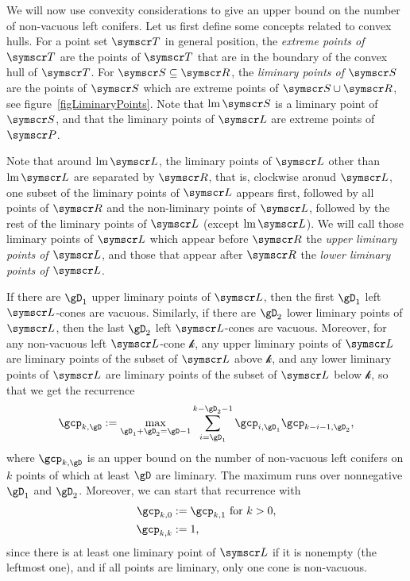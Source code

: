 We will now use convexity considerations to give an upper bound on the number of non-vacuous left conifers.
Let us first define some concepts related to convex hulls.
For a point set $\pointset T$ in general position, the
\emph{extreme points of $\pointset T$} are the points of $\pointset T$ that
are in the boundary of the convex hull of $\pointset T$.
For $\pointset S\Subset \pointset R$, the
\emph{liminary points of $\pointset S$} are the points of $\pointset S$ which are extreme points
of $\pointset S\Union \pointset R$, see figure~\ref{figLiminaryPoints}.
Note that $\leftmost\pointset S$ is a liminary point of $\pointset S$, and that
the liminary points of $\pointset L$ are extreme points of $\pointset P$.

Note that around $\leftmost\pointset L$, the liminary points of $\pointset L$ other than
$\leftmost\pointset L$ are separated by
$\pointset R$, that is, clockwise aronud $\pointset L$, one subset of the liminary points of $\pointset L$ appears
first, followed by
all points of $\pointset R$ and the non-liminary points of $\pointset L$,
followed by the rest of the liminary points of $\pointset L$ (except $\leftmost\pointset L$).
We will call those liminary points of $\pointset L$ which appear before $\pointset R$ the \emph{upper
liminary points of $\pointset L$},
and those that appear after $\pointset R$ the \emph{lower liminary points of $\pointset L$}.

If there are $\gD_1$ upper liminary points of $\pointset L$, then the first $\gD_1$ left
$\pointset L$-cones are vacuous.
Similarly, if there are $\gD_2$ lower liminary points of $\pointset L$, then the last
$\gD_2$ left $\pointset L$-cones are vacuous. Moreover, for any non-vacuous left $\pointset L$-cone
$\mathscr{k}$, any upper liminary points
of $\pointset L$ are liminary points of the
subset of $\pointset L$ above $\mathscr{k}$, and any lower liminary points of $\pointset L$ are
liminary points of the
subset of $\pointset L$ below $\mathscr{k}$, so that we get the recurrence
\[\gcp_{k,\gD}\DefineAs\max_{\gD_1+\gD_2=\gD-1}\sum{i=\gD_1}[k-\gD_2-1]\gcp_{i,\gD_1}\gcp_{k-i-1,\gD_2}\text,\]
where $\gcp_{k,\gD}$ is an upper bound on the number of non-vacuous left conifers on $k$ points
of which at least $\gD$ are liminary. The maximum runs over nonnegative $\gD_1$ and $\gD_2$.
Moreover, we can start that recurrence with
\begin{align*}
\gcp_{k,0}&\DefineAs\gcp_{k,1}\text{ for $k>0$,}\\
\gcp_{k,k}&\DefineAs1\text,
\end{align*}
since there is at least one liminary point of $\pointset L$ if it is nonempty (the leftmost one), and if all
points are liminary, only one cone is non-vacuous.

